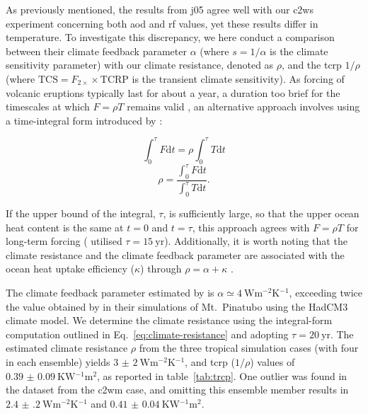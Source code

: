 \documentclass{ametsocV6.1}
\begin{document}
As previously mentioned, the results from \gls{j05} agree well with our \gls{c2ws}
experiment concerning both \gls{aod} and \gls{rf} values, yet these results differ in
temperature. To investigate this discrepancy, we here conduct a comparison between their
climate feedback parameter \(\alpha \) (where \(s=1/\alpha \) is the climate sensitivity
parameter) with our climate resistance, denoted as \(\rho \), and the \gls{tcrp}
\(1/\rho\) (where \(\mathrm{TCS}=F_{2\times}\times \mathrm{TCRP}\) is the transient
climate sensitivity). As forcing of volcanic eruptions typically last for about a year,
a duration too brief for the timescales at which \(F=\rho T\) remains valid
\citep{gregory2016}, an alternative approach involves using a time-integral form
introduced by \citet{merlis2014}:

\begin{equation}
  \int_0^{\tau}F \mathrm{d}t=\rho\int_{0}^{\tau}T \mathrm{d}t
\end{equation}
\begin{equation}
  \rho=\frac{\int_0^{\tau}F \mathrm{d}t}{\int_{0}^{\tau}T \mathrm{d}t}.
  \label{eq:climate-resistance}
\end{equation}

If the upper bound of the integral, \(\tau \), is sufficiently large, so that the upper
ocean heat content is the same at \(t=0\) and \(t=\tau \), this approach agrees with
\(F=\rho T\) for long-term forcing \citep{gregory2016} (\citet{merlis2014} utilised
\(\tau =\SI{15}{\mathrm{yr}}\)). Additionally, it is worth noting that the climate
resistance and the climate feedback parameter are associated with the ocean heat uptake
efficiency (\(\kappa \)) through \(\rho =\alpha +\kappa \) \citep{gregory2016}.

The climate feedback parameter estimated by \citet{jones2005} is \(\alpha \simeq
\SI{4}{\watt\metre^{-2}\kelvin^{-1}}\), exceeding twice the value obtained by
\citet{gregory2016} in their simulations of Mt.\ Pinatubo using the HadCM3 climate
model. We determine the climate resistance using the integral-form computation outlined
in Eq.~\ref{eq:climate-resistance} and adopting \(\tau =\SI{20}{\mathrm{yr}}\). The
estimated climate resistance \(\rho \) from the three tropical simulation cases (with
four in each ensemble) yields \(\SI{3(2)}{\watt\metre^{-2}\kelvin^{-1}}\), and
\gls{tcrp} (\(1/\rho\)) values of \(\SI{0.39(9)}{\kelvin\watt^{-1}\metre^{2}}\), as
reported in table~\ref{tab:trcp}. One outlier was found in the dataset from the
\gls{c2wm} case, and omitting this ensemble member results in
\(\SI{2.4(2)}{\watt\metre^{-2}\kelvin^{-1}}\) and
\(\SI{0.41(4)}{\kelvin\watt^{-1}\metre^{2}}\).
\end{document}
